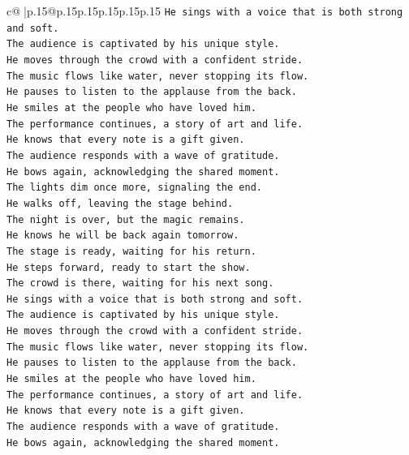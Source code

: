 \documentclass{article}
\begin{document}
{\begin{supertabular}{c@{$\;$}|p{.15\linewidth}@{}p{.15\linewidth}p{.15\linewidth}p{.15\linewidth}p{.15\linewidth}p{.15\linewidth}}
{{{\texttt{He sings with a voice that is both strong and soft.} \\
\texttt{The audience is captivated by his unique style.} \\
\texttt{He moves through the crowd with a confident stride.} \\
\texttt{The music flows like water, never stopping its flow.} \\
\texttt{He pauses to listen to the applause from the back.} \\
\texttt{He smiles at the people who have loved him.} \\
\texttt{The performance continues, a story of art and life.} \\
\texttt{He knows that every note is a gift given.} \\
\texttt{The audience responds with a wave of gratitude.} \\
\texttt{He bows again, acknowledging the shared moment.} \\
\texttt{The lights dim once more, signaling the end.} \\
\texttt{He walks off, leaving the stage behind.} \\
\texttt{The night is over, but the magic remains.} \\
\texttt{He knows he will be back again tomorrow.} \\
\texttt{The stage is ready, waiting for his return.} \\
\texttt{He steps forward, ready to start the show.} \\
\texttt{The crowd is there, waiting for his next song.} \\
\texttt{He sings with a voice that is both strong and soft.} \\
\texttt{The audience is captivated by his unique style.} \\
\texttt{He moves through the crowd with a confident stride.} \\
\texttt{The music flows like water, never stopping its flow.} \\
\texttt{He pauses to listen to the applause from the back.} \\
\texttt{He smiles at the people who have loved him.} \\
\texttt{The performance continues, a story of art and life.} \\
\texttt{He knows that every note is a gift given.} \\
\texttt{The audience responds with a wave of gratitude.} \\
\texttt{He bows again, acknowledging the shared moment.} \\
}}}
\end{supertabular}}
\end{document}
